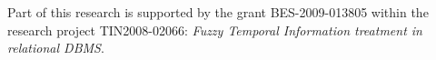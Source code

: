 \documentclass[twoside,twocolumn,a4paper]{article}
\begin{document}
%

\begin{ack}
Part of this research is supported by the grant BES-2009-013805 within the research project TIN2008-02066: \emph{Fuzzy Temporal Information treatment in relational DBMS}.
\end{ack}





%
%
%


\end{document}
